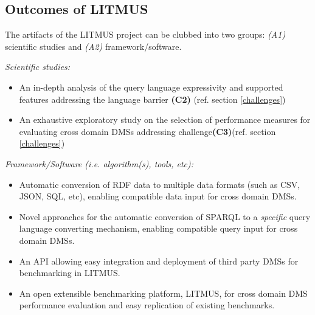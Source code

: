 \documentclass{llncs}
\newcommand{\todoproofread}[3]{
    \todoitemtemplate{#1}{#2}{Please proof read above section; #3}{inline}{yellow}
}
\newcommand{\todoitemtemplate}[5]{%
\todo[#4,color=#5,caption=X]{{#1}{ \textbf{{\tiny{for}} #2}:}{#3}}%
}
\begin{document}
    \subsection{Outcomes of LITMUS}\label{outcomes}
    The artifacts of the LITMUS project can be clubbed into two groups: \textit{(A1)} scientific studies and \textit{(A2)} framework/software. 
    
    \textit{Scientific studies:} 
        \begin{itemize}[nosep]
            \item An in-depth analysis of the query language expressivity and supported features addressing the language barrier \textbf{(C2)} (ref. section \ref{challenges})
            \item An exhaustive exploratory study on the selection of performance measures for evaluating cross domain DMSs addressing challenge\textbf{(C3)}(ref. section \ref{challenges})
        \end{itemize}
        
         \textit{Framework/Software (i.e. algorithm(s), tools, etc):} 
        \begin{itemize}[nosep]
            \item Automatic conversion of RDF data to multiple data formats (such as CSV, JSON, SQL, etc), enabling compatible data input for cross domain DMSs. 
            \item Novel approaches for the automatic conversion of SPARQL to a \textit{specific} query language converting mechanism, enabling compatible query input for cross domain DMSs.
            \item An API allowing easy integration and deployment of third party DMSs for benchmarking in LITMUS.%
            \item An open extensible benchmarking platform, LITMUS, for cross domain DMS performance evaluation and easy replication of existing benchmarks.
        \end{itemize}       
\end{document}

